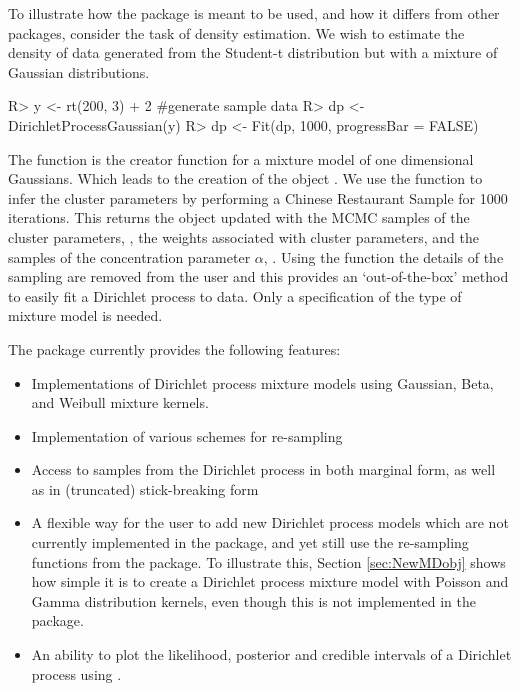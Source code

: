 \documentclass[nojss]{jss}
\begin{document}
To illustrate how the package is meant to be used, and how it differs from other  packages, consider the task of density estimation. We wish to estimate the density of data generated from the Student-t distribution but with a mixture of Gaussian distributions.

\begin{Schunk}
\begin{Sinput}
R> y <- rt(200, 3) + 2 #generate sample data
R> dp <- DirichletProcessGaussian(y)
R> dp <- Fit(dp, 1000, progressBar = FALSE)
\end{Sinput}
\end{Schunk}

The function  is the creator function for a mixture model of one dimensional Gaussians. Which leads to the creation of the object . We use the function  to infer the cluster parameters by performing a Chinese Restaurant Sample for 1000 iterations. This returns the object  updated with the MCMC samples of the cluster parameters, , the weights associated with cluster parameters,  and the samples of the concentration parameter $\alpha$, . Using the  function the details of the sampling are removed from the user and this provides an `out-of-the-box' method to easily fit a Dirichlet process to data. Only a specification of the type of mixture model is needed.

The  package currently provides the following features:

\begin{itemize}
\item Implementations of Dirichlet process mixture models using Gaussian, Beta, and Weibull mixture kernels.
\item Implementation of various schemes for re-sampling
\item Access to samples from the Dirichlet process in both marginal form, as well as in (truncated) stick-breaking form
\item A flexible way for the user to add new Dirichlet process models which are not currently implemented in the package, and yet still use the re-sampling functions from the package. To illustrate this, Section \ref{sec:NewMDobj} shows how simple it is to create a Dirichlet process mixture model with Poisson and Gamma distribution kernels, even though this is not implemented in the package.
\item An ability to plot the likelihood, posterior and credible intervals of a Dirichlet process using .
\end{itemize}
\end{document}
